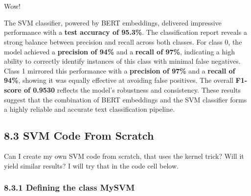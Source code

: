 \documentclass[11pt]{article}
\begin{document}
    \begin{center}
    \end{center}
    { \hspace*{\fill} \\}
    
    \begin{center}
    \end{center}
    { \hspace*{\fill} \\}
    
    Wow!

The SVM classifier, powered by BERT embeddings, delivered impressive
performance with a \textbf{test accuracy of 95.3\%}. The classification
report reveals a strong balance between precision and recall across both
classes. For class 0, the model achieved a \textbf{precision of 94\%}
and a \textbf{recall of 97\%}, indicating a high ability to correctly
identify instances of this class with minimal false negatives. Class 1
mirrored this performance with a \textbf{precision of 97\%} and a
\textbf{recall of 94\%}, showing it was equally effective at avoiding
false positives. The overall \textbf{F1-score of 0.9530} reflects the
model's robustness and consistency. These results suggest that the
combination of BERT embeddings and the SVM classifier forms a highly
reliable and accurate text classification pipeline.

\subsection{8.3 SVM Code From Scratch}\label{svm-code-from-scratch}

Can I create my own SVM code from scratch, that uses the kernel trick?
Will it yield similar results? I will try that in the code cell below.

    \subsubsection{8.3.1 Defining the class
MySVM}\label{defining-the-class-mysvm}
\end{document}
